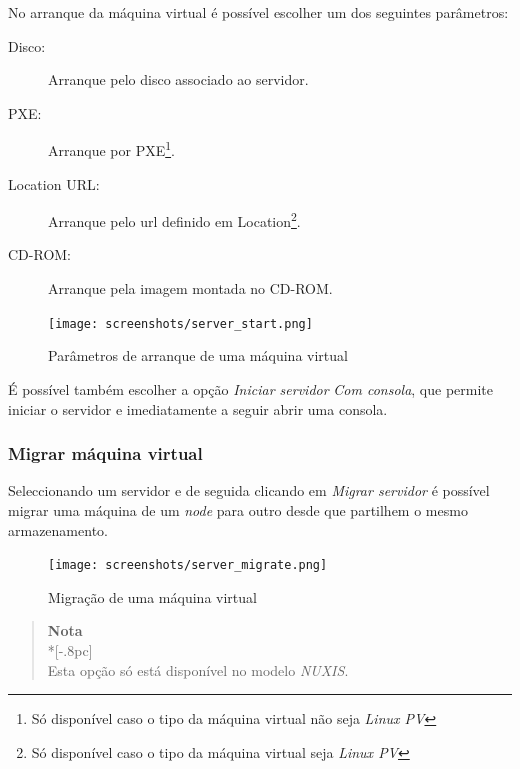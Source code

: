 No arranque da máquina virtual é possível escolher um dos seguintes parâmetros:
\begin{description}
	\item[Disco:] Arranque pelo disco associado ao servidor.
    \item[PXE:] Arranque por PXE\footnote{Só disponível caso o tipo da máquina virtual não seja \emph{Linux PV}\label{foot:notpv}}.
    \item[Location URL:] Arranque pelo url definido em Location\footnote{Só disponível caso o tipo da máquina virtual seja \emph{Linux PV}}.
	\item[CD-ROM:] Arranque pela imagem montada no CD-ROM.
    	 
\end{description}

\begin{figure}[H]
	\begin{center}
	\texttt{[image: screenshots/server\_start.png]}
	\caption{Parâmetros de arranque de uma máquina virtual}
	\label{fig:server_start}
	\end{center}
\end{figure}

É possível também escolher a opção \emph{Iniciar servidor} \emph{Com consola}, que permite iniciar o servidor e imediatamente a seguir abrir uma consola.

\subsubsection{Migrar máquina virtual}
\label{sec:migrate_server}

Seleccionando um servidor e de seguida clicando em \emph{Migrar servidor} é possível migrar uma máquina de um \emph{node} para outro desde que partilhem o mesmo armazenamento.

\begin{figure}[H]
	\begin{center}
	\texttt{[image: screenshots/server\_migrate.png]}
	\caption{Migração de uma máquina virtual}
	\label{fig:server_migrate}
	\end{center}
\end{figure}

\begin{quote}
	{\large \bf Nota} \\*[-.8pc]
	\underline{\hspace{6in}} \\
	Esta opção só está disponível no modelo \emph{NUXIS}.
\end{quote}

